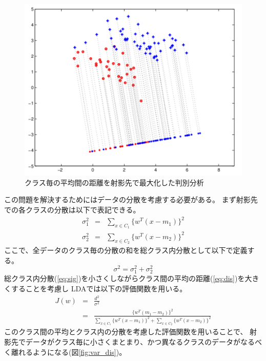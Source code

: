 \begin{figure}
    \centering
    \includegraphics[width=12cm]{images/mean_dis.png}
    \caption{クラス毎の平均間の距離を射影先で最大化した判別分析}
    \label{fig:mean_dis}
\end{figure}
この問題を解決するためにはデータの分散を考慮する必要がある。
まず射影先での各クラスの分散は以下で表記できる。
\begin{eqnarray}
    \sigma^2_{1} & = & \sum_{x\in C_1}\{w^T(x-m_1)\}^2 \nonumber \\
    \sigma^2_{2} & = & \sum_{x\in C_2}\{w^T(x-m_2)\}^2
\end{eqnarray}
ここで、全データのクラス毎の分散の和を総クラス内分散として以下で定義する。
\begin{equation}
    \sigma^2  = \sigma^2_1 + \sigma^2_2
    \label{eq:sig}
\end{equation}
総クラス内分散(\ref{eq:sig})を小さくしながらクラス間の平均の距離(\ref{eq:dis})を大きくすることを考慮し
LDAでは以下の評価関数を用いる。
\begin{eqnarray}
    J(w) & = & \frac{d^2}{\sigma^2} \nonumber \\
    & = & \frac{\{w^T(m_1-m_2)\}^2}{\sum_{x\in C_1}\{w^T(x-m_1)\}^2 + \sum_{x\in C_2}\{w^T(x-m_2)\}^2}
\end{eqnarray}
このクラス間の平均とクラス内の分散を考慮した評価関数を用いることで、
射影先でデータがクラス毎に小さくまとまり、かつ異なるクラスのデータがなるべく離れるようになる(図\ref{fig:var_dis})。

